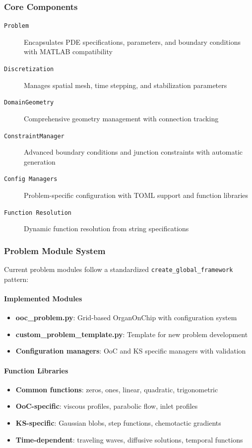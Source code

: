 \subsubsection{Core Components}

\begin{description}
    \item[\texttt{Problem}] Encapsulates PDE specifications, parameters, and boundary conditions with MATLAB compatibility
    \item[\texttt{Discretization}] Manages spatial mesh, time stepping, and stabilization parameters
    \item[\texttt{DomainGeometry}] Comprehensive geometry management with connection tracking
    \item[\texttt{ConstraintManager}] Advanced boundary conditions and junction constraints with automatic generation
    \item[\texttt{Config Managers}] Problem-specific configuration with TOML support and function libraries
    \item[\texttt{Function Resolution}] Dynamic function resolution from string specifications
\end{description}

\subsubsection{Problem Module System}

Current problem modules follow a standardized \texttt{create\_global\_framework} pattern:

\paragraph{Implemented Modules}
\begin{itemize}
    \item \textbf{ooc\_problem.py}: Grid-based OrganOnChip with configuration system
    \item \textbf{custom\_problem\_template.py}: Template for new problem development
    \item \textbf{Configuration managers}: OoC and KS specific managers with validation
\end{itemize}

\paragraph{Function Libraries}
\begin{itemize}
    \item \textbf{Common functions}: zeros, ones, linear, quadratic, trigonometric
    \item \textbf{OoC-specific}: viscous profiles, parabolic flow, inlet profiles
    \item \textbf{KS-specific}: Gaussian blobs, step functions, chemotactic gradients
    \item \textbf{Time-dependent}: traveling waves, diffusive solutions, temporal functions
\end{itemize}


